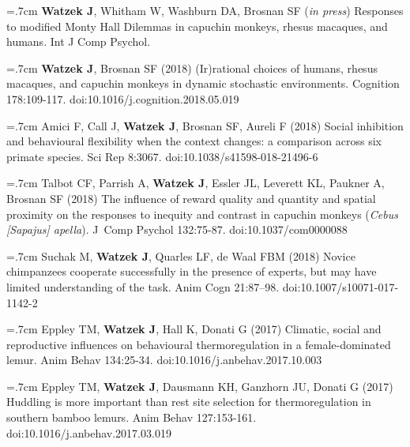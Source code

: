 \documentclass[]{friggeri-cv}
\begin{document}
\hangindent=.7cm \textbf{Watzek J}, Whitham W, Washburn DA, Brosnan SF (\emph{in press}) Responses to modified Monty Hall Dilemmas in capuchin monkeys, rhesus macaques, and humans. Int J Comp Psychol.

\hangindent=.7cm \textbf{Watzek J}, Brosnan SF (2018) (Ir)rational choices of humans, rhesus macaques, and capuchin monkeys in dynamic stochastic environments. Cognition 178:109-117. doi:10.1016/j.cognition.2018.05.019

\hangindent=.7cm Amici F, Call J, \textbf{Watzek J}, Brosnan SF, Aureli F (2018) Social inhibition and behavioural flexibility when the context changes: a comparison across six primate species. Sci Rep 8:3067. doi:10.1038/s41598-018-21496-6

\hangindent=.7cm Talbot CF, Parrish A, \textbf{Watzek J}, Essler JL, Leverett KL, Paukner A, Brosnan SF (2018) The influence of reward quality and quantity and spatial proximity on the responses to inequity and contrast in capuchin monkeys (\emph{Cebus [Sapajus] apella}). J~Comp Psychol 132:75-87. doi:10.1037/com0000088

\hangindent=.7cm Suchak M, \textbf{Watzek J}, Quarles LF, de Waal FBM (2018) Novice chimpanzees cooperate successfully in the presence of experts, but may have limited understanding of the task. Anim Cogn 21:87–98. doi:10.1007/s10071-017-1142-2

\hangindent=.7cm Eppley TM, \textbf{Watzek J}, Hall K, Donati G (2017) Climatic, social and reproductive influences on behavioural thermoregulation in a female-dominated lemur. Anim Behav 134:25-34. doi:10.1016/j.anbehav.2017.10.003

\hangindent=.7cm Eppley TM, \textbf{Watzek J}, Dausmann KH, Ganzhorn JU, Donati G (2017) Huddling is more important than rest site selection for thermoregulation in southern bamboo lemurs. Anim Behav 127:153-161. doi:10.1016/j.anbehav.2017.03.019


\newpage
\thispagestyle{fancy}

\renewenvironment{aside}{%
  \let\oldsection\section
  \renewcommand{\section}[1]{
    \par\vspace{\baselineskip}{\Large\headingfont\color{headercolor} ##1}
  }
  \begin{textblock}{3.6}(1.5, 1.5)
  \begin{flushright}
  \obeycr
}{%
  \restorecr
  \end{flushright}
  \end{textblock}
  \let\section\oldsection
}
\end{document}
